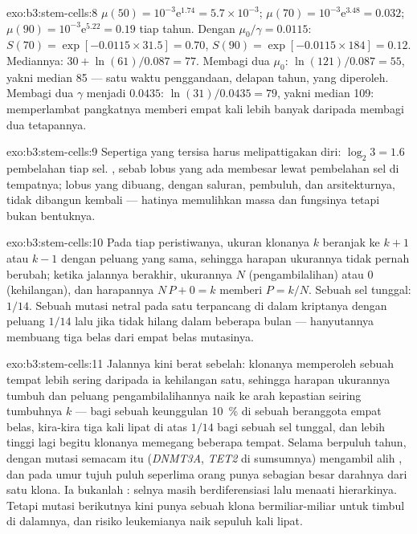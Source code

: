 \begin{solution}{exo:b3:stem-cells:8}
$\mu(50) = 10^{-3}\mathrm{e}^{1.74} = 5.7\times 10^{-3}$; $\mu(70) =
10^{-3}\mathrm{e}^{3.48} = 0.032$; $\mu(90) = 10^{-3}\mathrm{e}^{5.22} =
0.19$ tiap tahun. Dengan $\mu_{0}/\gamma = 0.0115$: $S(70) = \exp[-0.0115
\times 31.5] = 0.70$, $S(90) = \exp[-0.0115\times 184] = 0.12$. Mediannya:
$30 + \ln(61)/0.087 = 77$. Membagi dua $\mu_{0}$: $\ln(121)/0.087 = 55$,
yakni median 85 --- satu waktu penggandaan, delapan tahun, yang diperoleh. Membagi dua $\gamma$
menjadi $0.0435$: $\ln(31)/0.0435 = 79$, yakni median 109: memperlambat pangkatnya
memberi empat kali lebih banyak daripada membagi dua tetapannya.
\end{solution}

\begin{solution}{exo:b3:stem-cells:9}
Sepertiga yang tersisa harus melipattigakan diri: $\log_{2}3 = 1.6$ pembelahan tiap sel.
, sebab lobus yang ada membesar lewat pembelahan
sel di tempatnya; lobus yang dibuang, dengan saluran, pembuluh, dan
arsitekturnya, tidak dibangun kembali --- hatinya memulihkan massa dan
fungsinya tetapi bukan bentuknya.
\end{solution}

\begin{solution}{exo:b3:stem-cells:10}
Pada tiap peristiwanya, ukuran klonanya $k$ beranjak ke $k + 1$ atau $k - 1$ dengan peluang
yang sama, sehingga harapan ukurannya tidak pernah berubah; ketika jalannya berakhir, ukurannya
$N$ (pengambilalihan) atau $0$ (kehilangan), dan harapannya $N\,P + 0 = k$
memberi $P = k/N$. Sebuah sel tunggal: $1/14$. Sebuah mutasi netral pada satu  terpancang di dalam kriptanya dengan peluang $1/14$ lalu jika tidak hilang
dalam beberapa bulan --- hanyutannya membuang tiga belas dari empat belas mutasinya.
\end{solution}

\begin{solution}{exo:b3:stem-cells:11}
Jalannya kini berat sebelah: klonanya memperoleh sebuah tempat lebih sering daripada ia
kehilangan satu, sehingga harapan ukurannya tumbuh dan peluang pengambilalihannya
naik ke arah kepastian seiring tumbuhnya $k$ --- bagi sebuah keunggulan \qty{10}{\%} di
sebuah  beranggota empat belas, kira-kira tiga kali lipat di atas $1/14$ bagi sebuah sel tunggal,
dan lebih tinggi lagi begitu klonanya memegang beberapa tempat. Selama berpuluh tahun,  dengan mutasi semacam itu (\emph{DNMT3A}, \emph{TET2} di sumsumnya) mengambil
alih , dan pada umur tujuh puluh seperlima orang punya sebagian besar
darahnya dari satu klona. Ia bukanlah : selnya masih
berdiferensiasi lalu menaati hierarkinya. Tetapi mutasi berikutnya kini punya
sebuah klona bermiliar-miliar untuk timbul di dalamnya, dan risiko leukemianya naik
sepuluh kali lipat.
\end{solution}

